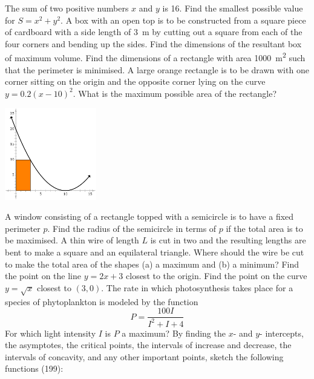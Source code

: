 \begin{questions}
  \questioM The sum of two positive numbers $ x $ and $ y $ is 16. Find the smallest possible value for $ S = x^2 + y^2 $.
  \questioM A box with an open top is to be constructed from a square piece of cardboard with a side length of \SI{3}{\metre}
            by cutting out a square from each of the four corners and bending up the sides. Find the dimensions of the resultant
            box of maximum volume.
  \questioM Find the dimensions of a rectangle with area \SI{1000}{\metre\squared} such that the perimeter is minimised.
  \questioE A large orange rectangle is to be drawn with one corner sitting on the origin and the opposite corner lying on
            the curve $ y = 0.2(x - 10)^2 $. What is the maximum possible area of the rectangle?
            \begin{center}
              \includegraphics[width=0.3\textwidth]{paramax}
            \end{center}
  \questioM A window consisting of a rectangle topped with a semicircle is to have a fixed perimeter $ p $. Find the radius
            of the semicircle in terms of $ p $ if the total area is to be maximised.
  \questioE A thin wire of length $ L $ is cut in two and the resulting lengths are bent to make a square and an equilateral triangle. Where
            should the wire be cut to make the total area of the shapes (a) a maximum and (b) a minimum?
  \questioE Find the point on the line $ y = 2x + 3 $ closest to the origin.
  \questioE Find the point on the curve $ y = \sqrt{x} $ closest to $ (3, 0) $.
  \questioM The rate in which photosynthesis takes place for a species of phytoplankton is modeled by the function
            \begin{displaymath}
              P = \frac{100I}{I^2 + I + 4}
            \end{displaymath}
            For which light intensity $ I $ is $ P $ a maximum?
  \questioE By finding the $ x$- and $ y$- intercepts, the asymptotes, the critical points, the
            intervals of increase and decrease, the intervals of concavity, and any other important
            points, sketch the following functions (199):
    \begin{parts}

\end{parts}
\end{questions}
